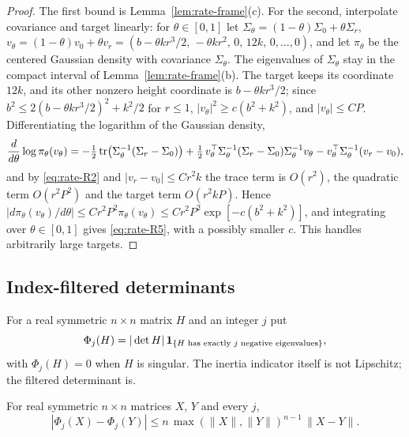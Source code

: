 \begin{proof}
The first bound is Lemma~\ref{lem:rate-frame}(c). For the second, interpolate covariance and target linearly: for $\theta\in[0,1]$ let $\Sigma_\theta=(1-\theta)\Sigma_0+\theta\Sigma_r$, $v_\theta=(1-\theta)v_0+\theta v_r=(b-\theta kr^3/2,\,-\theta kr^2,\,0,\,12k,\,0,\dots,0)$, and let $\pi_\theta$ be the centered Gaussian density with covariance $\Sigma_\theta$. The eigenvalues of $\Sigma_\theta$ stay in the compact interval of Lemma~\ref{lem:rate-frame}(b). The target keeps its coordinate $12k$, and its other nonzero height coordinate is $b-\theta kr^3/2$; since $b^2\le2(b-\theta kr^3/2)^2+k^2/2$ for $r\le1$, $|v_\theta|^2\ge c(b^2+k^2)$, and $|v_\theta|\le CP$. Differentiating the logarithm of the Gaussian density,
\[
\frac{d}{d\theta}\log\pi_\theta(v_\theta)=-\tfrac12\operatorname{tr}\bigl(\Sigma_\theta^{-1}(\Sigma_r-\Sigma_0)\bigr)+\tfrac12\,v_\theta^{\top}\Sigma_\theta^{-1}(\Sigma_r-\Sigma_0)\Sigma_\theta^{-1}v_\theta-v_\theta^{\top}\Sigma_\theta^{-1}(v_r-v_0),
\]
and by \eqref{eq:rate-R2} and $|v_r-v_0|\le Cr^2k$ the trace term is $O(r^2)$, the quadratic term $O(r^2P^2)$ and the target term $O(r^2kP)$. Hence $|d\pi_\theta(v_\theta)/d\theta|\le Cr^2P^2\pi_\theta(v_\theta)\le Cr^2P^2\exp[-c(b^2+k^2)]$, and integrating over $\theta\in[0,1]$ gives \eqref{eq:rate-R5}, with a possibly smaller $c$. This handles arbitrarily large targets.
\end{proof}

\subsection*{Index-filtered determinants}

For a real symmetric $n\times n$ matrix $H$ and an integer $j$ put
\begin{equation}\label{eq:rate-Phi}
\Phi_j(H)=|\det H|\,\mathbf 1_{\{H\text{ has exactly }j\text{ negative eigenvalues}\}},
\end{equation}
with $\Phi_j(H)=0$ when $H$ is singular. The inertia indicator itself is not Lipschitz; the filtered determinant is.

\begin{lemma}\label{lem:rate-filtered}
For real symmetric $n\times n$ matrices $X$, $Y$ and every $j$,
\begin{equation}\label{eq:rate-R6}
|\Phi_j(X)-\Phi_j(Y)|\le n\,\max(\|X\|,\|Y\|)^{n-1}\,\|X-Y\| .
\end{equation}
\end{lemma}

